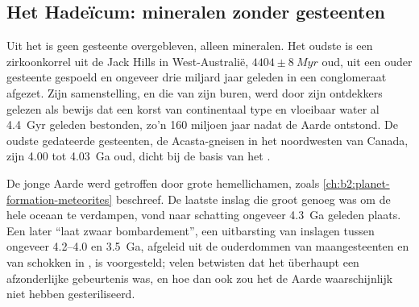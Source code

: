 \begin{omfigure}
\par{}
\end{omfigure}

\subsection*{Het Hadeïcum: mineralen zonder gesteenten}

Uit het  is geen gesteente overgebleven, alleen mineralen. Het oudste is een zirkoonkorrel uit de Jack
Hills in West-Australië, $4404 \pm \qty{8}{Myr}$ oud, uit een ouder gesteente gespoeld en
ongeveer drie miljard jaar geleden in een conglomeraat afgezet. Zijn samenstelling, en die van zijn
buren, werd door zijn ontdekkers gelezen als bewijs dat een korst van continentaal type en
vloeibaar water al \qty{4.4}{Gyr} geleden bestonden, zo'n 160 miljoen jaar nadat de Aarde
ontstond. De oudste gedateerde gesteenten, de Acasta-gneisen in het noordwesten van Canada, zijn 4.00 tot
\qty{4.03}{Ga} oud, dicht bij de basis van het .

De jonge Aarde werd getroffen door grote hemellichamen, zoals \cref{ch:b2:planet-formation-meteorites}
beschreef. De laatste inslag die groot genoeg was om
de hele oceaan te verdampen, vond naar schatting ongeveer \qty{4.3}{Ga} geleden plaats. Een later ``laat zwaar
bombardement'', een uitbarsting van inslagen tussen ongeveer 4.2--4.0 en \qty{3.5}{Ga}, afgeleid uit de
ouderdommen van maangesteenten en van schokken in , is voorgesteld; velen betwisten dat het überhaupt een
afzonderlijke gebeurtenis was, en hoe dan ook zou het de Aarde waarschijnlijk niet hebben gesteriliseerd.

